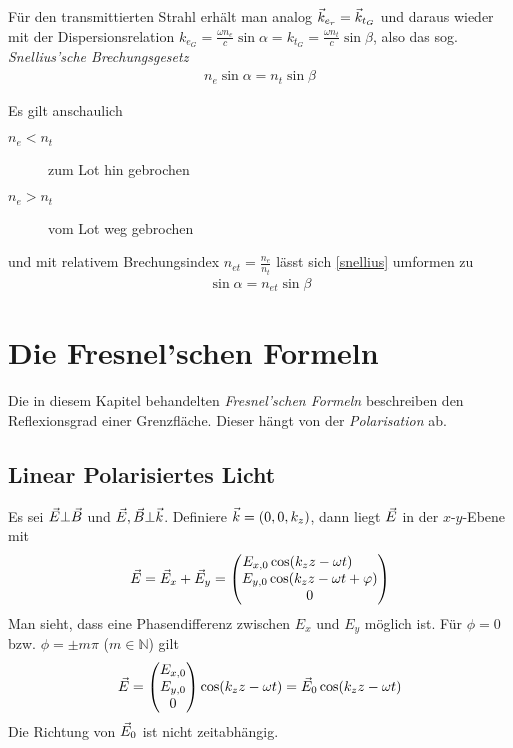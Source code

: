 Für den transmittierten Strahl
erhält man analog $\vec{k}_{e_r} = \vec{k}_{t_G}$ und daraus wieder mit
der Dispersionsrelation
$k_{e_G} = \frac{\omega n_e}{c}\sin\alpha 
= k_{t_G} =  \frac{\omega n_t}{c}\sin\beta$, also das sog.
\emph{Snellius'sche  Brechungsgesetz}%
%
\begin{gather}
  n_e\sin\alpha = n_t\sin\beta
  \label{snellius}
\end{gather}

Es gilt anschaulich
\begin{description}
\item[$n_e<n_t$] zum Lot hin gebrochen
\item[$n_e>n_t$] vom Lot weg gebrochen
\end{description}
und mit relativem Brechungsindex $n_{et}=\frac{n_e}{n_t}$ lässt sich
\eqref{snellius} umformen zu
\begin{gather*}
  \sin\alpha = n_{et} \sin\beta
\end{gather*}


\section{Die Fresnel'schen Formeln}
Die in diesem Kapitel behandelten 
\emph{Fresnel'schen Formeln}
beschreiben den Reflexionsgrad einer Grenzfläche.
Dieser hängt von der \emph{Polarisation} ab.

\subsection{Linear Polarisiertes Licht}\label{4.3.1}%
Es sei $\vec{E}\bot\vec{B}$ und $\vec{E},\vec{B}\bot\vec{k}$.
Definiere $\vec{k}= (0,0,k_z)$, dann liegt $\vec{E}$ in der $x$-$y$-Ebene
mit
\begin{gather*}
  \vec{E} = \vec{E}_x + \vec{E}_y 
  =\begin{pmatrix}
    E_{x,0} \cos(k_z z - \omega t)\phantom{~+ \varphi}\\
    E_{y,0} \cos(k_z z - \omega t + \varphi)\\
    0
  \end{pmatrix}
\end{gather*}
Man sieht, dass eine Phasendifferenz zwischen $E_x$ und $E_y$
möglich ist. Für $\phi=0$ bzw. $\phi=\pm m\pi$ ($m\in\mathds{N}$) gilt
\begin{gather*}
  \vec{E} = \begin{pmatrix} E_{x,0}\\E_{y,0}\\0 \end{pmatrix}
  \cos(k_zz - \omega t)
  = \vec{E}_0  \cos(k_zz - \omega t)
\end{gather*}
Die Richtung von $\vec{E}_0$ ist nicht zeitabhängig.

